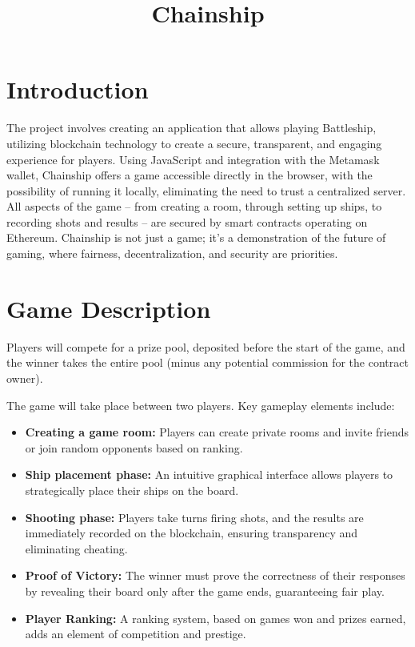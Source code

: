 \documentclass{article}
\title{Chainship}
\date{}
\begin{document}
\maketitle

\section{Introduction}

The project involves creating an application that allows playing Battleship, utilizing blockchain technology to create a secure, transparent, and engaging experience for players. Using JavaScript and integration with the Metamask wallet, Chainship offers a game accessible directly in the browser, with the possibility of running it locally, eliminating the need to trust a centralized server. All aspects of the game – from creating a room, through setting up ships, to recording shots and results – are secured by smart contracts operating on Ethereum. Chainship is not just a game; it's a demonstration of the future of gaming, where fairness, decentralization, and security are priorities.

\section{Game Description}

Players will compete for a prize pool, deposited before the start of the game, and the winner takes the entire pool (minus any potential commission for the contract owner).

The game will take place between two players. Key gameplay elements include:
\begin{itemize}
    \item \textbf{Creating a game room:} Players can create private rooms and invite friends or join random opponents based on ranking.
    \item \textbf{Ship placement phase:} An intuitive graphical interface allows players to strategically place their ships on the board.
    \item \textbf{Shooting phase:} Players take turns firing shots, and the results are immediately recorded on the blockchain, ensuring transparency and eliminating cheating.
    \item \textbf{Proof of Victory:} The winner must prove the correctness of their responses by revealing their board only after the game ends, guaranteeing fair play.
    \item \textbf{Player Ranking:} A ranking system, based on games won and prizes earned, adds an element of competition and prestige.
\end{itemize}
\end{document}
